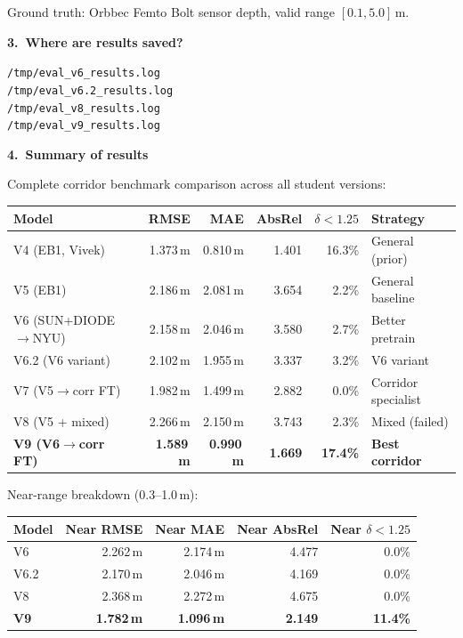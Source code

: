 \documentclass[11pt,a4paper]{article}
\begin{document}
Ground truth: Orbbec Femto Bolt sensor depth, valid range
$[0.1, 5.0]$\,m.

\textbf{3.\ Where are results saved?}

\texttt{/tmp/eval\_v6\_results.log}\\
\texttt{/tmp/eval\_v6.2\_results.log}\\
\texttt{/tmp/eval\_v8\_results.log}\\
\texttt{/tmp/eval\_v9\_results.log}

\textbf{4.\ Summary of results}

Complete corridor benchmark comparison across all student versions:

\begin{center}
\footnotesize
\begin{tabular}{lrrrrl}
\toprule
\textbf{Model} & \textbf{RMSE} & \textbf{MAE}
  & \textbf{AbsRel} & \textbf{$\delta{<}1.25$} & \textbf{Strategy} \\
\midrule
V4 (EB1, Vivek)     & 1.373\,m & 0.810\,m & 1.401 & 16.3\%
  & General (prior) \\
V5 (EB1)            & 2.186\,m & 2.081\,m & 3.654 &  2.2\%
  & General baseline \\
V6 (SUN+DIODE$\to$NYU) & 2.158\,m & 2.046\,m & 3.580 &  2.7\%
  & Better pretrain \\
V6.2 (V6 variant)   & 2.102\,m & 1.955\,m & 3.337 &  3.2\%
  & V6 variant \\
V7 (V5$\to$corr FT) & 1.982\,m & 1.499\,m & 2.882 &  0.0\%
  & Corridor specialist \\
V8 (V5 + mixed)     & 2.266\,m & 2.150\,m & 3.743 &  2.3\%
  & Mixed (failed) \\
\textbf{V9 (V6$\to$corr FT)} & \textbf{1.589\,m} & \textbf{0.990\,m}
  & \textbf{1.669} & \textbf{17.4\%}
  & \textbf{Best corridor} \\
\bottomrule
\end{tabular}
\end{center}

Near-range breakdown (0.3--1.0\,m):

\begin{center}
\footnotesize
\begin{tabular}{lrrrr}
\toprule
\textbf{Model} & \textbf{Near RMSE} & \textbf{Near MAE}
  & \textbf{Near AbsRel} & \textbf{Near $\delta{<}1.25$} \\
\midrule
V6              & 2.262\,m & 2.174\,m & 4.477 &  0.0\% \\
V6.2            & 2.170\,m & 2.046\,m & 4.169 &  0.0\% \\
V8              & 2.368\,m & 2.272\,m & 4.675 &  0.0\% \\
\textbf{V9}     & \textbf{1.782\,m} & \textbf{1.096\,m}
  & \textbf{2.149} & \textbf{11.4\%} \\
\bottomrule
\end{tabular}
\end{center}
\end{document}
